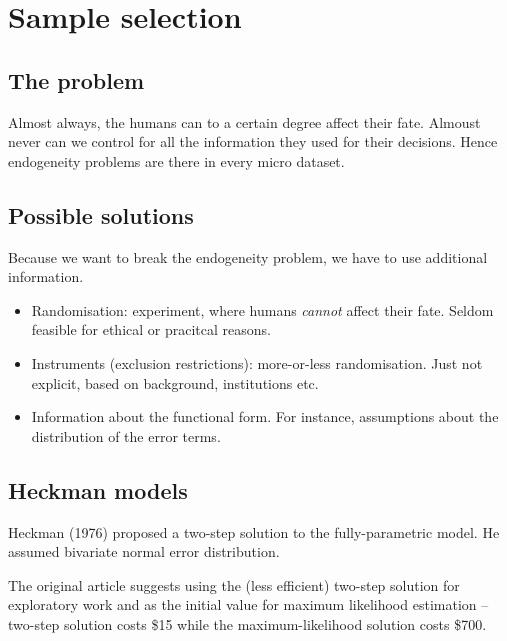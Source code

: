 \section{Sample selection}


\subsection{The problem}

Almost always, the humans can to a certain degree affect their fate.
Almoust never can we control for all the information they used for
their decisions.  Hence endogeneity problems are there in every micro
dataset.


\subsection{Possible solutions}

Because we want to break the endogeneity problem, we have to use
additional information.

\begin{itemize}
\item Randomisation: experiment, where humans \emph{cannot} affect
  their fate.  Seldom feasible for ethical or pracitcal reasons.
\item Instruments (exclusion restrictions): more-or-less
  randomisation.  Just not explicit, based on background, institutions
  etc.
\item Information about the functional form.  For instance,
  assumptions about the distribution of the error terms.
\end{itemize}


\subsection{Heckman models}

Heckman (1976) proposed a two-step solution to the fully-parametric
model.  He assumed bivariate normal error distribution.

The original article suggests using the (less efficient) two-step
solution for exploratory work and as the initial value for maximum
likelihood estimation -- two-step solution costs \$15 while the
maximum-likelihood solution costs \$700.

